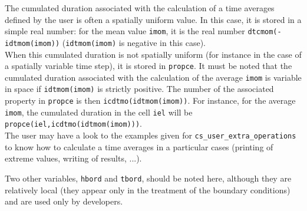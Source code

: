 {{{\label{prg_moyennes}
The cumulated duration associated with the calculation of a time averages
defined by the user is often a spatially uniform value. In this case, it
is stored in a simple real number: for the mean value \texttt{imom}, it is the
real number \texttt{dtcmom(-idtmom(imom))}%
 (\texttt{idtmom(imom)} is negative in this case).\\
When this cumulated duration is not spatially uniform (for instance in the case
of a spatially variable time step), it is stored in \texttt{propce}. It must be
noted that the cumulated duration associated with the calculation of
the average \texttt{imom} is variable in space if \texttt{idtmom(imom)} is strictly
positive. The number of the associated property in \texttt{propce} is then
\texttt{icdtmo(idtmom(imom))}. For instance, for the
average \texttt{imom}, the cumulated duration in the cell \texttt{iel} will be
\texttt{propce(iel,icdtmo(idtmom(imom)))}.\\
The user may have a look to the examples given for
\texttt{cs\_user\_extra\_operations} to know
how to calculate a time averages in a particular cases (printing of extreme
values, writing of results, ...).

\bigskip

Two other variables, \texttt{hbord} and \texttt{tbord}, should be noted here,
although they are relatively local (they appear only in the treatment of the
boundary conditions) and are used only by developers.



}}}
